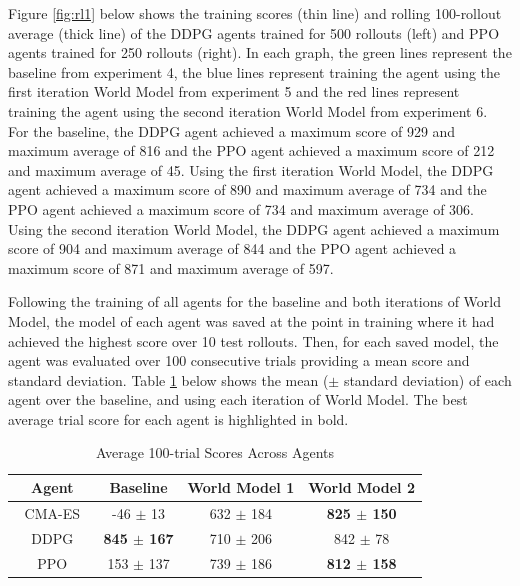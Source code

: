 Figure \ref{fig:rl1} below shows the training scores (thin line) and rolling 100-rollout average (thick line) of the DDPG agents trained for 500 rollouts (left) and PPO agents trained for 250 rollouts (right). In each graph, the green lines represent the baseline from experiment 4, the blue lines represent training the agent using the first iteration World Model from experiment 5 and the red lines represent training the agent using the second iteration World Model from experiment 6. For the baseline, the DDPG agent achieved a maximum score of 929 and maximum average of 816 and the PPO agent achieved a maximum score of 212 and maximum average of 45. Using the first iteration World Model, the DDPG agent achieved a maximum score of 890 and maximum average of 734 and the PPO agent achieved a maximum score of 734 and maximum average of 306. Using the second iteration World Model, the DDPG agent achieved a maximum score of 904 and maximum average of 844 and the PPO agent achieved a maximum score of 871 and maximum average of 597.

Following the training of all agents for the baseline and both iterations of World Model, the model of each agent was saved at the point in training where it had achieved the highest score over 10 test rollouts. Then, for each saved model, the agent was evaluated over 100 consecutive trials providing a mean score and standard deviation. Table \ref{tab:trials} below shows the mean ($\pm$ standard deviation) of each agent over the baseline, and using each iteration of World Model. The best average trial score for each agent is highlighted in bold.

\begin{table}[h]
    \caption{Average 100-trial Scores Across Agents}\label{tab:trials}
 	\hspace{2em}
	\centering %
	\small %
	\begin{tabular}{cccc} %
    \toprule[\heavyrulewidth]\toprule[\heavyrulewidth]
    \textbf{\ \ Agent\ \ } 	& \textbf{Baseline} & \textbf{World Model 1} 	& \textbf{World Model 2} 	\\
    \midrule
    CMA-ES			& -46 $\pm$ 13				& 632 $\pm$ 184						& \textbf{825 $\pm$ 150}	\\
 	\midrule
    DDPG			& \textbf{845 $\pm$ 167}	& 710 $\pm$ 206						& 842 $\pm$ 78				\\
 	\midrule
    PPO				& 153 $\pm$ 137	 			& 739 $\pm$ 186						& \textbf{812 $\pm$ 158}	\\
    \bottomrule[\heavyrulewidth] 
    \end{tabular}
\end{table}

